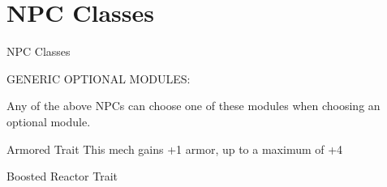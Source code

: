 \section{NPC Classes}

        NPC Classes 




















































   

                                     GENERIC OPTIONAL MODULES:  

Any of the above NPCs can choose one of these modules when choosing an optional module.
 

Armored  
Trait  
This mech gains +1 armor, up to a maximum of +4
 

Boosted Reactor  
Trait
 

